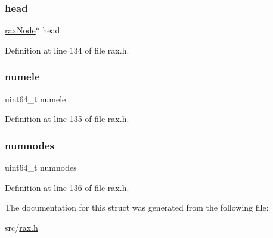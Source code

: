 \subsubsection{\texorpdfstring{head}{head}}
{\footnotesize\ttfamily \hyperlink{structrax_node}{rax\+Node}$\ast$ head}



Definition at line 134 of file rax.\+h.

\mbox{\label{structrax_aeb57ec87f1c4514577f9ed22bfc1041d}} 
\subsubsection{\texorpdfstring{numele}{numele}}
{\footnotesize\ttfamily uint64\+\_\+t numele}



Definition at line 135 of file rax.\+h.

\mbox{\label{structrax_abbdb3a945f35e1cd7a50bcabf1bb6828}} 
\subsubsection{\texorpdfstring{numnodes}{numnodes}}
{\footnotesize\ttfamily uint64\+\_\+t numnodes}



Definition at line 136 of file rax.\+h.



The documentation for this struct was generated from the following file\+:\begin{DoxyCompactItemize}
\item 
src/\hyperlink{rax_8h}{rax.\+h}\end{DoxyCompactItemize}
